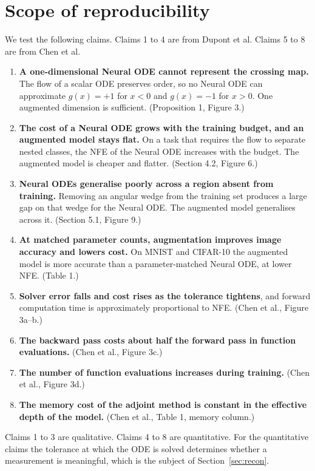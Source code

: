 \section{Scope of reproducibility}
\label{sec:scope}

We test the following claims. Claims 1 to 4 are from Dupont et al. Claims 5 to 8 are from
Chen et al.

\begin{enumerate}
  \item \textbf{A one-dimensional Neural ODE cannot represent the crossing map.} The flow of
        a scalar ODE preserves order, so no Neural ODE can approximate $g(x)=+1$ for $x<0$
        and $g(x)=-1$ for $x>0$. One augmented dimension is sufficient. (Proposition 1,
        Figure 3.)
  \item \textbf{The cost of a Neural ODE grows with the training budget, and an augmented
        model stays flat.} On a task that requires the flow to separate nested classes, the
        NFE of the Neural ODE increases with the budget. The augmented model is cheaper and
        flatter. (Section 4.2, Figure 6.)
  \item \textbf{Neural ODEs generalise poorly across a region absent from training.}
        Removing an angular wedge from the training set produces a large gap on that wedge
        for the Neural ODE. The augmented model generalises across it. (Section 5.1,
        Figure 9.)
  \item \textbf{At matched parameter counts, augmentation improves image accuracy and lowers
        cost.} On MNIST and CIFAR-10 the augmented model is more accurate than a
        parameter-matched Neural ODE, at lower NFE. (Table 1.)
  \item \textbf{Solver error falls and cost rises as the tolerance tightens}, and forward
        computation time is approximately proportional to NFE. (Chen et al., Figure 3a--b.)
  \item \textbf{The backward pass costs about half the forward pass in function
        evaluations.} (Chen et al., Figure 3c.)
  \item \textbf{The number of function evaluations increases during training.} (Chen et al.,
        Figure 3d.)
  \item \textbf{The memory cost of the adjoint method is constant in the effective depth of
        the model.} (Chen et al., Table 1, memory column.)
\end{enumerate}

Claims 1 to 3 are qualitative. Claims 4 to 8 are quantitative. For the quantitative claims
the tolerance at which the ODE is solved determines whether a measurement is meaningful,
which is the subject of Section~\ref{sec:recon}.

